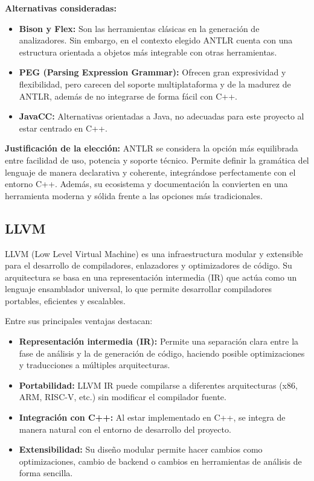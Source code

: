 \textbf{Alternativas consideradas:}
\begin{itemize}
    \item \textbf{Bison y Flex:} Son las herramientas clásicas en la generación de analizadores. Sin embargo, en el contexto elegido ANTLR cuenta con una estructura orientada a objetos más integrable con otras herramientas.
    \item \textbf{PEG (Parsing Expression Grammar):} Ofrecen gran expresividad y flexibilidad, pero carecen del soporte multiplataforma y de la madurez de ANTLR, además de no integrarse de forma fácil con C++.
    \item \textbf{JavaCC:} Alternativas orientadas a Java, no adecuadas para este proyecto al estar centrado en C++.
\end{itemize}

\textbf{Justificación de la elección:}  
ANTLR se considera la opción más equilibrada entre facilidad de uso, potencia y soporte técnico. Permite definir la gramática del lenguaje de manera declarativa y coherente, integrándose perfectamente con el entorno C++. Además, su ecosistema y documentación la convierten en una herramienta moderna y sólida frente a las opciones más tradicionales.

\subsection{LLVM}
LLVM (Low Level Virtual Machine) es una infraestructura modular y extensible para el desarrollo de compiladores, enlazadores y optimizadores de código. Su arquitectura se basa en una representación intermedia (IR) que actúa como un lenguaje ensamblador universal, lo que permite desarrollar compiladores portables, eficientes y escalables.

Entre sus principales ventajas destacan:
\begin{itemize}
    \item \textbf{Representación intermedia (IR):} Permite una separación clara entre la fase de análisis y la de generación de código, haciendo posible optimizaciones y traducciones a múltiples arquitecturas.
    \item \textbf{Portabilidad:} LLVM IR puede compilarse a diferentes arquitecturas (x86, ARM, RISC-V, etc.) sin modificar el compilador fuente.
    \item \textbf{Integración con C++:} Al estar implementado en C++, se integra de manera natural con el entorno de desarrollo del proyecto.
    \item \textbf{Extensibilidad:} Su diseño modular permite hacer cambios como optimizaciones, cambio de backend o cambios en herramientas de análisis de forma sencilla.
\end{itemize}

